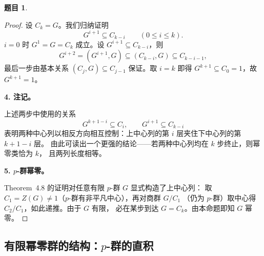 \documentclass[a4paper]{ctexart}
\theoremstyle{definition}
\newtheorem{example}{题目}[section]
\theoremstyle{analysis}
\theoremstyle{plain}
\begin{document}
\begin{example}
\begin{proof}
设 \(C_k=G\)。我们归纳证明
\[
  G^{i+1}\subseteq C_{k-i}\qquad (0\le i\le k).
\]
\(i=0\) 时 \(G^1=G=C_k\) 成立。设 \(G^{i+1}\subseteq C_{k-i}\)，则
\[
  G^{i+2}=(G^{i+1},G)\subseteq(C_{k-i},G)\subseteq C_{k-i-1},
\]
最后一步由基本关系 \((C_j,G)\subseteq C_{j-1}\) 保证。取 \(i=k\) 即得
\(G^{k+1}\subseteq C_0=1\)，故 \(G^{k+1}=1\)。

\textbf{4. 注记。}

上述两步中使用的关系
\[
  G^{k+1-i}\subseteq C_i,\qquad G^{i+1}\subseteq C_{k-i}
\]
表明两种中心列以相反方向相互控制：上中心列的第 \(i\) 层夹住下中心列的第 \(k+1-i\) 层。
由此可读出一个更强的结论——若两种中心列均在 \(k\) 步终止，则幂零类恰为 \(k\)，
且两列长度相等。

\textbf{5. \(p\)-群幂零。}

Theorem~4.8 的证明对任意有限 \(p\)-群 \(G\) 显式构造了上中心列：
取 \(C_1=Z(G)\neq 1\)（\(p\)-群有非平凡中心），再对商群 \(G/C_1\)
（仍为 \(p\)-群）取中心得 \(C_2/C_1\)，如此递推。由于 \(G\) 有限，
必在某步到达 \(G=C_k\)。由本命题即知 \(G\) 幂零。
\end{proof}
\end{example}

\subsection{\texorpdfstring{有限幂零群的结构：\(p\)-群的直积}{有限幂零群的结构：p-群的直积}}\label{subsec:problem-nilpotent-p-product}
\end{document}
